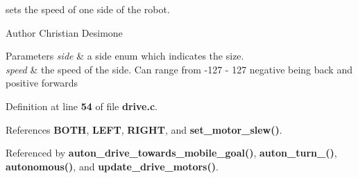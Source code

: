 sets the speed of one side of the robot. 

\begin{DoxyAuthor}{Author}
Christian Desimone 
\end{DoxyAuthor}

\begin{DoxyParams}{Parameters}
{\em side} & a side enum which indicates the size. \\
\hline
{\em speed} & the speed of the side. Can range from -\/127 -\/ 127 negative being back and positive forwards \\
\hline
\end{DoxyParams}


Definition at line \textbf{ 54} of file \textbf{ drive.\+c}.



References \textbf{ B\+O\+TH}, \textbf{ L\+E\+FT}, \textbf{ R\+I\+G\+HT}, and \textbf{ set\+\_\+motor\+\_\+slew()}.



Referenced by \textbf{ auton\+\_\+drive\+\_\+towards\+\_\+mobile\+\_\+goal()}, \textbf{ auton\+\_\+turn\+\_()}, \textbf{ autonomous()}, and \textbf{ update\+\_\+drive\+\_\+motors()}.


